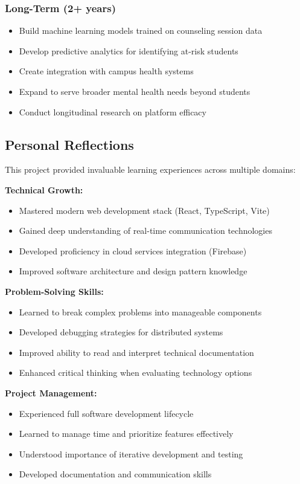 \documentclass[11pt,a4paper]{article}
\begin{document}
\subsubsection{Long-Term (2+ years)}
\begin{itemize}
    \item Build machine learning models trained on counseling session data
    \item Develop predictive analytics for identifying at-risk students
    \item Create integration with campus health systems
    \item Expand to serve broader mental health needs beyond students
    \item Conduct longitudinal research on platform efficacy
\end{itemize}

\subsection{Personal Reflections}

This project provided invaluable learning experiences across multiple domains:

\textbf{Technical Growth:}
\begin{itemize}
    \item Mastered modern web development stack (React, TypeScript, Vite)
    \item Gained deep understanding of real-time communication technologies
    \item Developed proficiency in cloud services integration (Firebase)
    \item Improved software architecture and design pattern knowledge
\end{itemize}

\textbf{Problem-Solving Skills:}
\begin{itemize}
    \item Learned to break complex problems into manageable components
    \item Developed debugging strategies for distributed systems
    \item Improved ability to read and interpret technical documentation
    \item Enhanced critical thinking when evaluating technology options
\end{itemize}

\textbf{Project Management:}
\begin{itemize}
    \item Experienced full software development lifecycle
    \item Learned to manage time and prioritize features effectively
    \item Understood importance of iterative development and testing
    \item Developed documentation and communication skills
\end{itemize}
\end{document}
